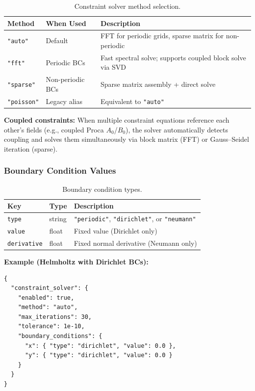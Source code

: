 \begin{table}[htbp]
\centering
\caption{Constraint solver method selection.}
\label{tab:json-constraint-method}
\begin{tabular}{@{}lll@{}}
\toprule
Method & When Used & Description \\
\midrule
\texttt{"auto"}    & Default          & FFT for periodic grids, sparse matrix for non-periodic \\
\texttt{"fft"}     & Periodic BCs     & Fast spectral solve; supports coupled block solve via SVD \\
\texttt{"sparse"}  & Non-periodic BCs & Sparse matrix assembly + direct solve \\
\texttt{"poisson"} & Legacy alias     & Equivalent to \texttt{"auto"} \\
\bottomrule
\end{tabular}
\end{table}

\textbf{Coupled constraints:} When multiple constraint equations reference each other's fields (e.g., coupled Proca $A_0$/$B_0$), the solver automatically detects coupling and solves them simultaneously via block matrix (FFT) or Gauss--Seidel iteration (sparse).

\subsubsection{Boundary Condition Values}
\label{sec:json-constraint-bcs}

\begin{table}[htbp]
\centering
\caption{Boundary condition types.}
\label{tab:json-constraint-bcs}
\begin{tabular}{@{}lll@{}}
\toprule
Key & Type & Description \\
\midrule
\texttt{type}       & string & \texttt{"periodic"}, \texttt{"dirichlet"}, or \texttt{"neumann"} \\
\texttt{value}      & float  & Fixed value (Dirichlet only) \\
\texttt{derivative} & float  & Fixed normal derivative (Neumann only) \\
\bottomrule
\end{tabular}
\end{table}

\textbf{Example (Helmholtz with Dirichlet BCs):}

\begin{lstlisting}[style=json]
{
  "constraint_solver": {
    "enabled": true,
    "method": "auto",
    "max_iterations": 30,
    "tolerance": 1e-10,
    "boundary_conditions": {
      "x": { "type": "dirichlet", "value": 0.0 },
      "y": { "type": "dirichlet", "value": 0.0 }
    }
  }
}
\end{lstlisting}

